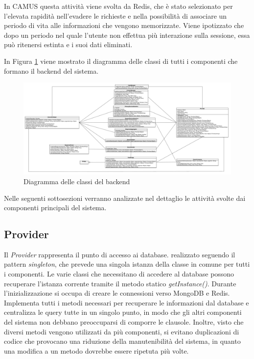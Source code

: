 In CAMUS questa attività viene svolta da Redis, che è stato selezionato per l'elevata rapidità nell'evadere le richieste e nella possibilità di associare un periodo di vita alle informazioni che vengono memorizzate. Viene ipotizzato che dopo un periodo nel quale l'utente non effettua più interazione sulla sessione, essa può ritenersi estinta e i suoi dati eliminati.

In Figura \ref{fig:class-diagram-backend} viene mostrato il diagramma delle classi di tutti i componenti che formano il backend del sistema.

\begin{figure}[ht]
	\hspace*{-2.2cm}
	\centering
	\includegraphics[width=1.4\textwidth]{5-implementazione-backend/Immagini/diagramma_classi_backend.png}
	\caption{Diagramma delle classi del backend}\label{fig:class-diagram-backend}
\end{figure}

Nelle seguenti sottosezioni verranno analizzate nel dettaglio le attività svolte dai componenti principali del sistema.

\subsection{Provider\label{sec:provider}}

Il \emph{Provider} rappresenta il punto di accesso ai database. \upe realizzato seguendo il pattern \emph{singleton}, che prevede una singola istanza della classe in comune per tutti i componenti. Le varie classi che necessitano di accedere al database possono recuperare l'istanza corrente tramite il metodo statico \emph{getInstance()}. Durante l'inizializzazione si occupa di creare le connessioni verso MongoDB e Redis. Implementa tutti i metodi necessari per recuperare le informazioni dal database e centralizza le query tutte in un singolo punto, in modo che gli altri componenti del sistema non debbano preoccuparsi di comporre le clausole. Inoltre, visto che diversi metodi vengono utilizzati da più componenti, si evitano duplicazioni di codice che provocano una riduzione della manutenibilità del sistema, in quanto una modifica a un metodo dovrebbe essere ripetuta più volte.

